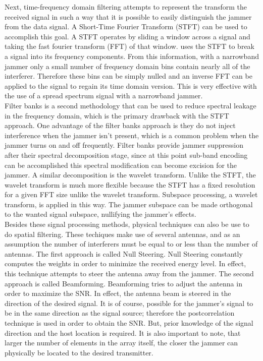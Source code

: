 Next, time-frequency domain filtering attempts to represent the transform the received signal in such a way that it is possible to easily distinguish the jammer from the data signal.  A Short-Time Fourier Transform (STFT) can be used to accomplish this goal.  A STFT operates by sliding a window across a signal and taking the fast fourier transform (FFT) of that window.  \cite{12} uses the STFT to break a signal into its frequency components. From this information, with a narrowband jammer only a small number of frequency domain bins contain nearly all of the interferer.  Therefore these bins can be simply nulled and an inverse FFT can be applied to the signal to regain its time domain version.  This is very effective with the use of a spread spectrum signal with a narrowband jammer.\\

%
%

Filter banks is a second methodology that can be used to reduce spectral leakage in the frequency domain, which is the primary drawback with the STFT approach.  One advantage of the filter banks approach is they do not inject interference when the jammer isn't present, which is a common problem when the jammer turns on and off frequently.  Filter banks provide jammer suppression after their spectral decomposition stage, since at this point sub-band encoding can be accomplished this spectral modification can become excision for the jammer\cite{13}.  A similar decomposition is the wavelet transform.  Unlike the STFT, the wavelet transform is much more flexible because the STFT has a fixed resolution for a given FFT size unlike the wavelet transform.  Subspace processing, a wavelet transform, is applied in this way.  The jammer subspace can be made orthogonal to the wanted signal subspace, nullifying the jammer's effects\cite{14}.\\

Besides these signal processing methods, physical techniques can also be use to do spatial filtering.  These techiques make use of several antennas, and as an assumption the number of interferers must be equal to or less than the number of antennas.  The first approach is called Null Steering.  Null Steering constantly computes the weights in order to minimize the received energy level. In effect, this technique attempts to steer the antenna away from the jammer.  The second approach is called Beamforming.  Beamforming tries to adjust the antenna in order to maximize the SNR. In effect, the antenna beam is steered in the direction of the desired signal.  It is of course, possible for the jammer's signal to be in the same direction as the signal source; therefore the postcorrelation technique is used in order to obtain the SNR. But, prior knowledge of the signal direction and the host location is required\cite{kandangath}.  It is also important to note, that larger the number of elements in the array itself, the closer the jammer can physically be located to the desired transmitter.\\


